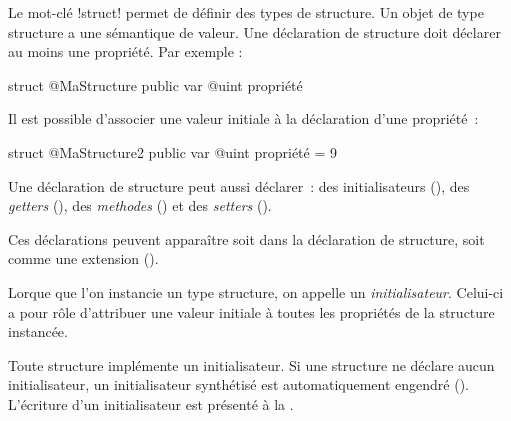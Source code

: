 




Le mot-clé \ggsq!struct! permet de définir des types de structure. Un objet de type structure a une sémantique de valeur. Une déclaration de structure doit déclarer au moins une propriété. Par exemple :

\begin{galgas34}
struct @MaStructure {
  public var @uint propriété
}
\end{galgas34}

Il est possible d'associer une valeur initiale à la déclaration d'une propriété~:
\begin{galgas34}
struct @MaStructure2 {
  public var @uint propriété = 9
}
\end{galgas34}

Une déclaration de structure peut aussi déclarer~: des initialisateurs (), des \emph{getters} (), des \emph{methodes} () et des \emph{setters} ().

Ces déclarations peuvent apparaître soit dans la déclaration de structure, soit comme une extension ().













Lorque que l'on instancie un type structure, on appelle un \emph{initialisateur}. Celui-ci a pour rôle d'attribuer une valeur initiale à toutes les propriétés de la structure instancée.


Toute structure implémente un initialisateur. Si une structure ne déclare aucun initialisateur, un initialisateur synthétisé est automatiquement engendré (). L'écriture d'un initialisateur est présenté à la .


